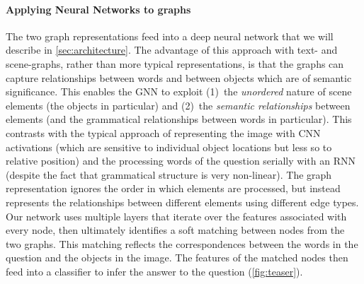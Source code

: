 \paragraph{Applying Neural Networks to graphs} The two graph representations feed into a deep neural network that we will describe in \sect\ref{sec:architecture}. The advantage of this approach with text- and scene-graphs, rather than more typical representations, is that the graphs can capture relationships between words and between objects which are of semantic significance.  This enables the GNN to exploit (1)~the \textit{unordered} nature of scene elements (the objects in particular) and (2)~the \emph{semantic relationships} between elements (and the grammatical relationships between words in particular). This contrasts with the typical approach of representing the image with CNN activations (which are sensitive to individual object locations but less so to relative position) and the processing words of the question serially with an RNN (despite the fact that grammatical structure is very non-linear). The graph representation ignores the order in which elements are processed, but instead represents the relationships between different elements using different edge types. Our network uses multiple layers that iterate over the features associated with every node, then ultimately identifies a soft matching between nodes from the two graphs. This matching reflects the correspondences between the words in the question and the objects in the image. The features of the matched nodes then feed into a classifier to infer the answer to the question (\fig\ref{fig:teaser}).

